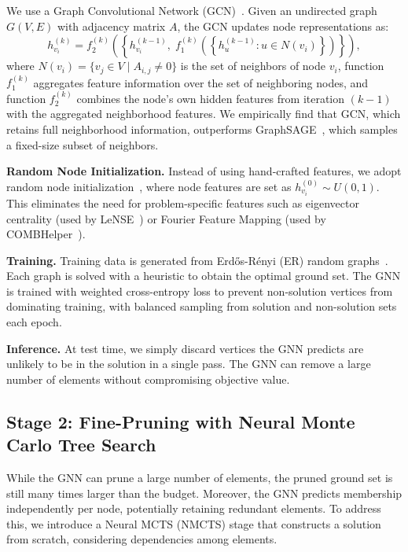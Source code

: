 We use a Graph Convolutional Network (GCN)~\citep{kipf2016semi}. Given an undirected graph
$G(V, E)$ with adjacency matrix $A$, the GCN updates node representations as:
\[
h_{v_i}^{(k)} = f_2^{(k)}\!\left(\left\{h_{v_i}^{(k-1)},\;
f_1^{(k)}\!\left(\left\{h_u^{(k-1)} : u \in N(v_i)\right\}\right)\right\}\right),
\]
where $N(v_i) = \{v_j \in V \mid A_{i,j} \neq 0\}$ is the set of neighbors of node
$v_i$, function $f_1^{(k)}$ aggregates feature information over the set of neighboring
nodes, and function $f_2^{(k)}$ combines the node's own hidden features from iteration
$(k-1)$ with the aggregated neighborhood features. We empirically find that GCN,
which retains full neighborhood information, outperforms GraphSAGE~\citep{hamilton2017inductive}, which samples a
fixed-size subset of neighbors.

\textbf{Random Node Initialization.} Instead of using hand-crafted features, we adopt
random node initialization~\citep{abboud2020surprising}, where node features are set as
$h_{v_i}^{(0)} \sim U(0,1)$. This eliminates the need for problem-specific features such as eigenvector centrality
(used by LeNSE~\citep{ireland2022lense}) or Fourier Feature Mapping (used by
COMBHelper~\citep{tian2024combhelper}).

\textbf{Training.} Training data is generated from Erd\H{o}s-R\'{e}nyi (ER) random
graphs~\citep{erdos1960evolution}. Each graph is solved with a heuristic to obtain the
optimal ground set.
The GNN is trained with weighted cross-entropy loss to prevent non-solution vertices from
dominating training, with balanced sampling from solution and non-solution sets each
epoch.

\textbf{Inference.} At test time, we simply discard vertices the GNN predicts are
unlikely to be in the solution in a single pass. The GNN can remove a large number of
elements without compromising objective value.

\subsection{Stage 2: Fine-Pruning with Neural Monte Carlo Tree Search}

While the GNN can prune a large number of elements, the pruned ground set is still many
times larger than the budget. Moreover, the GNN predicts membership independently per
node, potentially retaining redundant elements. To address this, we introduce a Neural
MCTS (NMCTS) stage that constructs a solution from scratch, considering dependencies
among elements.

